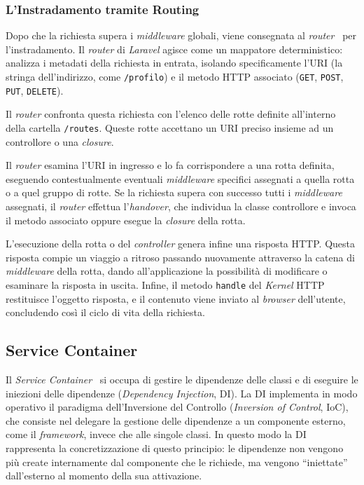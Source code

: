 \subsubsection*{L'Instradamento tramite Routing}
Dopo che la richiesta supera i \textit{middleware} globali, viene consegnata al \textit{router}~\autocite{RoutingLaravel13x} per l’instradamento. Il \textit{router} di \textit{Laravel} agisce come un mappatore deterministico: analizza i metadati della richiesta in entrata, isolando specificamente l'URI (la stringa dell'indirizzo, come \texttt{/profilo}) e il metodo HTTP associato (\texttt{GET}, \texttt{POST}, \texttt{PUT}, \texttt{DELETE}).

Il \textit{router} confronta questa richiesta con l’elenco delle rotte definite all’interno della cartella \texttt{/routes}. Queste rotte accettano un URI preciso insieme ad un controllore o una \textit{closure}. 

Il \textit{router} esamina l'URI in ingresso e lo fa corrispondere a una rotta definita, eseguendo contestualmente eventuali \textit{middleware} specifici assegnati a quella rotta o a quel gruppo di rotte. Se la richiesta supera con successo tutti i \textit{middleware} assegnati, il \textit{router} effettua l'\textit{handover}, che individua la classe controllore e invoca il metodo associato oppure esegue la \textit{closure} della rotta.

L'esecuzione della rotta o del \textit{controller} genera infine una risposta HTTP. Questa risposta compie un viaggio a ritroso passando nuovamente attraverso la catena di \textit{middleware} della rotta, dando all'applicazione la possibilità di modificare o esaminare la risposta in uscita. Infine, il metodo \texttt{handle} del \textit{Kernel} HTTP restituisce l'oggetto risposta, e il contenuto viene inviato al \textit{browser} dell'utente, concludendo così il ciclo di vita della richiesta.

\subsection{Service Container}
Il \textit{Service Container}~\autocite{ServiceContainerLaravel} si occupa di gestire le dipendenze delle classi e di eseguire le iniezioni delle dipendenze (\textit{Dependency Injection}, DI).
La DI implementa in modo operativo il paradigma dell'Inversione del Controllo (\textit{Inversion of Control}, IoC), che consiste nel delegare la gestione delle dipendenze a un componente esterno, come il \textit{framework}, invece che alle singole classi. In questo modo la DI rappresenta la concretizzazione di questo principio: le dipendenze non vengono più create internamente dal componente che le richiede, ma vengono ``iniettate'' dall'esterno al momento della sua attivazione.

